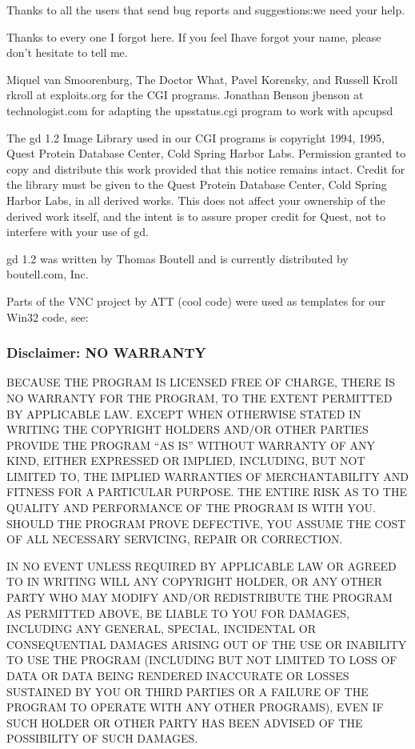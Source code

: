 {{{{{{{{{{{{{{{{{Thanks to all the users that send bug reports and suggestions:we need your
help.  

Thanks to every one I forgot here. If you feel Ihave forgot your name, please
don't hesitate to tell me.  

Miquel van Smoorenburg, The Doctor What, Pavel Korensky, and Russell Kroll
\lt{}rkroll at exploits.org\gt{} for the CGI programs. Jonathan Benson
\lt{}jbenson at technologist.com\gt{} for adapting the upsstatus.cgi program
to work with apcupsd  

The gd 1.2 Image Library used in our CGI programs is copyright 1994, 1995,
Quest Protein Database Center, Cold Spring Harbor Labs. Permission granted to
copy and distribute this work provided that this notice remains intact. Credit
for the library must be given to the Quest Protein Database Center, Cold
Spring Harbor Labs, in all derived works. This does not affect your ownership
of the derived work itself, and the intent is to assure proper credit for
Quest, not to interfere with your use of gd.  

gd 1.2 was written by Thomas Boutell and is currently distributed by
boutell.com, Inc.  

Parts of the VNC project by ATT (cool code) were used as templates for our
Win32 code, see: 


\label{Disclaimer_003b-NO-WARRANTY}

\subsubsection*{Disclaimer: NO WARRANTY}

\label{index-Disclaimer-264}
BECAUSE THE PROGRAM IS LICENSED FREE OF CHARGE, THERE IS NO WARRANTY FOR THE
PROGRAM, TO THE EXTENT PERMITTED BY APPLICABLE LAW. EXCEPT WHEN OTHERWISE
STATED IN WRITING THE COPYRIGHT HOLDERS AND/OR OTHER PARTIES PROVIDE THE
PROGRAM ``AS IS'' WITHOUT WARRANTY OF ANY KIND, EITHER EXPRESSED OR IMPLIED,
INCLUDING, BUT NOT LIMITED TO, THE IMPLIED WARRANTIES OF MERCHANTABILITY AND
FITNESS FOR A PARTICULAR PURPOSE. THE ENTIRE RISK AS TO THE QUALITY AND
PERFORMANCE OF THE PROGRAM IS WITH YOU. SHOULD THE PROGRAM PROVE DEFECTIVE,
YOU ASSUME THE COST OF ALL NECESSARY SERVICING, REPAIR OR CORRECTION.  

IN NO EVENT UNLESS REQUIRED BY APPLICABLE LAW OR AGREED TO IN WRITING WILL ANY
COPYRIGHT HOLDER, OR ANY OTHER PARTY WHO MAY MODIFY AND/OR REDISTRIBUTE THE
PROGRAM AS PERMITTED ABOVE, BE LIABLE TO YOU FOR DAMAGES, INCLUDING ANY
GENERAL, SPECIAL, INCIDENTAL OR CONSEQUENTIAL DAMAGES ARISING OUT OF THE USE
OR INABILITY TO USE THE PROGRAM (INCLUDING BUT NOT LIMITED TO LOSS OF DATA OR
DATA BEING RENDERED INACCURATE OR LOSSES SUSTAINED BY YOU OR THIRD PARTIES OR
A FAILURE OF THE PROGRAM TO OPERATE WITH ANY OTHER PROGRAMS), EVEN IF SUCH
HOLDER OR OTHER PARTY HAS BEEN ADVISED OF THE POSSIBILITY OF SUCH DAMAGES. 

}}}}}}}}}}}}}}}}}
